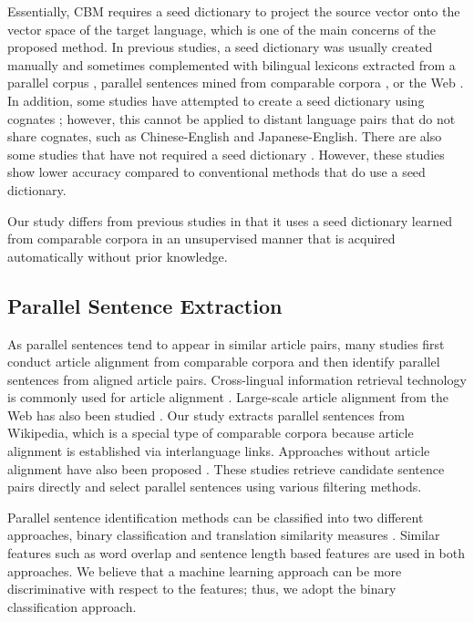 \documentclass[english]{jnlp_1.4}
\begin{document}
Essentially, CBM requires a seed dictionary to project
the source vector onto the vector space of the target language, which is
one of the main concerns of the proposed method. In previous studies, a seed
dictionary was usually created manually
\cite{rapp:1999:ACL,garera-callisonburch-yarowsky:2009:CoNLL} and
sometimes complemented with bilingual lexicons extracted
from a parallel corpus
\cite{fung-yee:1998:ACLCOLING,tamura-watanabe-sumita:2012:EMNLP-CoNLL},
parallel sentences mined from comparable corpora \cite{morin-prochasson:2011:BUCC},
or the Web \cite{prochasson-fung:2011:ACL-HLT2011}.
In addition, some studies have attempted to create a seed dictionary using
cognates \cite{koehn-knight:2002:ACL02-ULA,haghighi-EtAl:2008:ACLMain};
however, this cannot be applied to distant language pairs that do not
share cognates, such as Chinese-English and Japanese-English.
There are also some studies that have not required a seed dictionary
\cite{rapp:1995:ACL,fung:1995,yu-tsujii:2009:NAACLHLT09-Short}. However,
these studies show lower accuracy compared to conventional methods
that do use a seed dictionary.

Our study differs from previous studies in that it uses a seed dictionary learned 
from comparable corpora in an unsupervised manner that is acquired automatically 
without prior knowledge.

\subsection{Parallel Sentence Extraction}

As parallel sentences tend to appear in similar article pairs, many
studies first conduct article alignment from comparable corpora and then
identify parallel sentences from aligned article pairs.
Cross-lingual information retrieval technology is commonly used for article alignment
\cite{utiyama-isahara:2003:ACL,fung-cheung:2004:COLING,Munteanu:2005}.
Large-scale article alignment from the Web has also been studied
\cite{Resnik:2003:WPC:964751.964753,uszkoreit-EtAl:2010:PAPERS}.
Our study extracts parallel sentences from Wikipedia, which is a
special type of comparable corpora because article alignment is
established via interlanguage links. Approaches without article
alignment have also been proposed
\cite{tillmann:2009:Short,Abdul-RaufS11,Stefanescu:2012:EAMT,ling-EtAl:2013:ACL2013}.
These studies retrieve candidate sentence pairs directly and select
parallel sentences using various filtering methods. 

Parallel sentence identification methods can be classified into two
different approaches, binary classification
\cite{Munteanu:2005,tillmann:2009:Short,smith-quirk-toutanova:2010:NAACLHLT,Stefanescu:2012:EAMT}
and translation similarity measures
\cite{utiyama-isahara:2003:ACL,fung-cheung:2004:COLING,Abdul-RaufS11}.
Similar features such as word overlap and sentence length based features 
are used in both approaches. We believe that a machine learning 
approach can be more discriminative with respect to the features; thus, we adopt the binary 
classification approach.
\end{document}
